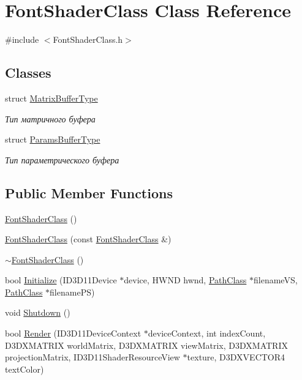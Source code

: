 \hypertarget{class_font_shader_class}{}\section{Font\+Shader\+Class Class Reference}
\label{class_font_shader_class}


{\ttfamily \#include $<$Font\+Shader\+Class.\+h$>$}

\subsection*{Classes}
\begin{DoxyCompactItemize}
\item 
struct \hyperlink{struct_font_shader_class_1_1_matrix_buffer_type}{Matrix\+Buffer\+Type}
\begin{DoxyCompactList}\small\item\em Тип матричного буфера \end{DoxyCompactList}\item 
struct \hyperlink{struct_font_shader_class_1_1_params_buffer_type}{Params\+Buffer\+Type}
\begin{DoxyCompactList}\small\item\em Тип параметрического буфера \end{DoxyCompactList}\end{DoxyCompactItemize}
\subsection*{Public Member Functions}
\begin{DoxyCompactItemize}
\item 
\hyperlink{class_font_shader_class_ad841a744054bd93f00fda46ddb7c668f}{Font\+Shader\+Class} ()
\item 
\hyperlink{class_font_shader_class_ac17e72941e311073f1ae73649e8ab34e}{Font\+Shader\+Class} (const \hyperlink{class_font_shader_class}{Font\+Shader\+Class} \&)
\item 
\hyperlink{class_font_shader_class_a5626568770e126c26772e8730ed958dc}{$\sim$\+Font\+Shader\+Class} ()
\item 
bool \hyperlink{class_font_shader_class_a8f6e5298f9847f62bcbe2283e157fd04}{Initialize} (I\+D3\+D11\+Device $\ast$device, H\+W\+ND hwnd, \hyperlink{class_path_class}{Path\+Class} $\ast$filename\+VS, \hyperlink{class_path_class}{Path\+Class} $\ast$filename\+PS)
\item 
void \hyperlink{class_font_shader_class_a2836953d2b421d2db28031dff12653e7}{Shutdown} ()
\item 
bool \hyperlink{class_font_shader_class_ac3e174bc1f7d38a6de26ee2b7b5beed2}{Render} (I\+D3\+D11\+Device\+Context $\ast$device\+Context, int index\+Count, D3\+D\+X\+M\+A\+T\+R\+IX world\+Matrix, D3\+D\+X\+M\+A\+T\+R\+IX view\+Matrix, D3\+D\+X\+M\+A\+T\+R\+IX projection\+Matrix, I\+D3\+D11\+Shader\+Resource\+View $\ast$texture, D3\+D\+X\+V\+E\+C\+T\+O\+R4 text\+Color)
\end{DoxyCompactItemize}
